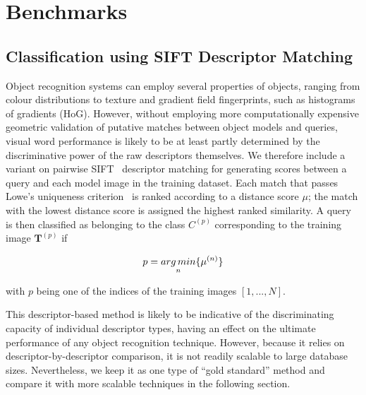 \section{Benchmarks} \label{sec:benchmarks}




\subsection{Classification using SIFT Descriptor Matching}
Object recognition systems can employ several properties of objects, ranging from colour distributions to texture and gradient field fingerprints, such as histograms of gradients (HoG). However, without employing more computationally expensive geometric validation of putative matches between object models and queries, visual word performance is likely to be at least partly determined by the discriminative power of the raw descriptors themselves.
We therefore include  a variant on pairwise SIFT~\cite{Lowe2004} descriptor matching for generating scores between a query and each model image in the training dataset. Each match that passes Lowe's uniqueness criterion~\cite{Lowe2004} is ranked according to a distance score $\mu$; the match with the lowest distance score is assigned the highest ranked similarity. A query is then classified  as belonging to the class $C^{(p)}$ corresponding to the training image $\mathbf{T}^{(p)}$ if

\begin{equation}
p = \underset{n}{arg\,min}\lbrace \mu^{(n)}\rbrace
\end{equation}


\noindent with $p$ being one of the indices of the training images $[1,...,N]$.


This descriptor-based method is likely to be indicative of the discriminating capacity of individual descriptor types, having an effect on the ultimate performance of any object recognition technique. However, because it relies on descriptor-by-descriptor comparison, it is not readily scalable to large database sizes. Nevertheless, we keep it as one type of ``gold standard'' method and compare it with more scalable techniques in the following section.


